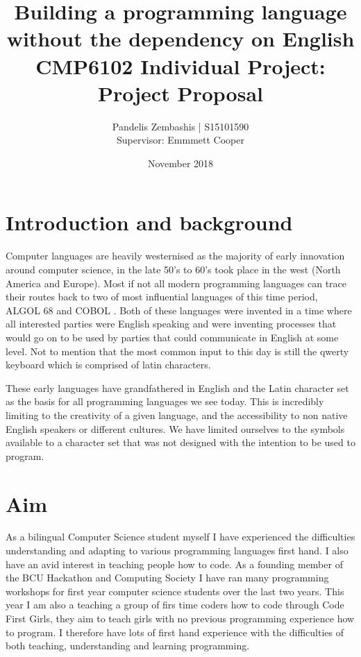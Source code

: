 \documentclass[12pt]{article}
\title{%
  Building a programming language without the dependency on English \\
  \large CMP6102 Individual Project:
 Project Proposal }
\author{Pandelis Zembashis | S15101590 \\ 
Supervisor: Emmmett Cooper}
\date{November 2018}
\begin{document}
\maketitle

\clearpage


\section{Introduction and background}

Computer languages are heavily westernised as the majority of 
early innovation around computer science, in the late 50's to 60's 
took place in the west (North America and Europe). Most if not all
modern programming languages can trace their routes back to two of
most influential languages of this time period, ALGOL 68 and COBOL 
\parencite{5396281}. Both of these languages were invented in a time
where all interested parties were English speaking and were inventing
processes that would go on to be used by parties that could communicate
in English at some level. Not to mention that the most common input to this
day is still the qwerty keyboard which is comprised of latin characters.

These early languages have grandfathered in English and the Latin 
character set as the basis for all programming languages we see today. 
This is incredibly limiting to the creativity of a given language,
and the accessibility to non native English speakers or different cultures. 
We have limited ourselves to the symbols available to a character set that was not designed with the intention
to be used to program.

\section{Aim}

As a bilingual Computer Science student myself 
I have experienced the difficulties understanding and adapting to various programming
languages first hand. I also have an avid interest in teaching people how to code. As a founding member of the BCU Hackathon and Computing Society \parencite{noauthor_hacs_nodate}
I have ran many programming workshops for first year computer science students over the last two years. This year I am also a teaching a group of firs time coders
how to code through Code First Girls\parencite{noauthor_code_nodate},
they aim to teach girls with no previous programming experience how to program. I therefore have lots of first hand experience with the
difficulties of both teaching, understanding and learning programming.
\end{document}
